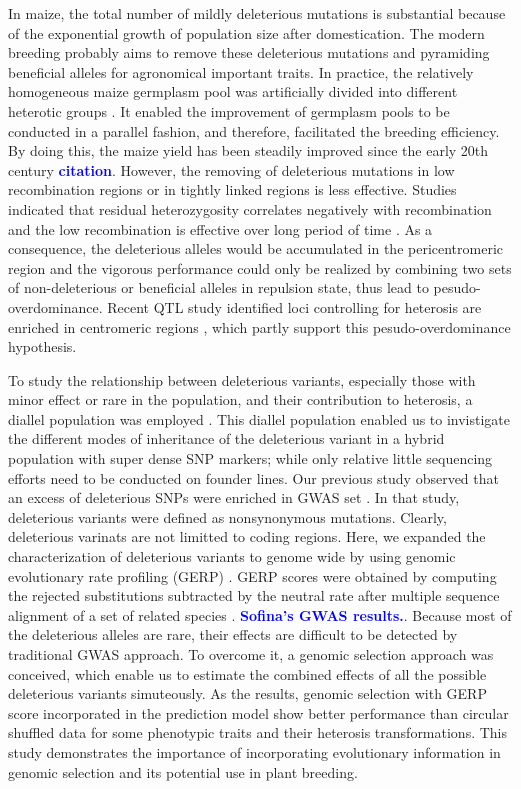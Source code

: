 \documentclass[9pt,twocolumn,twoside]{gsajnl}
\newcommand{\yang}[1]{\textcolor{blue}{\bf #1}}
\begin{document}
In maize, the total number of mildly deleterious mutations is substantial because of the exponential growth of population size after domestication. The modern breeding probably aims to remove these deleterious mutations and pyramiding beneficial alleles for agronomical important traits. In practice, the relatively homogeneous maize germplasm pool was artificially divided into different heterotic groups \citep{Heerwaarden2012}. It enabled the improvement of germplasm pools to be conducted in a parallel fashion, and therefore, facilitated the breeding efficiency. By doing this, the maize yield has been steadily improved since the early 20th century \yang{citation}. However, the removing of deleterious mutations in low recombination regions or in tightly linked regions is less effective. Studies indicated that residual heterozygosity correlates negatively with recombination \citep{Gore2009, McMullen2009} and the low recombination is effective over long period of time \citep{Haddrill2007}. As a consequence, the deleterious alleles would be accumulated in the pericentromeric region and the vigorous performance could only be realized by combining two sets of non-deleterious or beneficial alleles in repulsion state, thus lead to pesudo-overdominance. Recent QTL study identified loci controlling for heterosis are enriched in centromeric regions \citep{Lariepe2012}, which partly support this pesudo-overdominance hypothesis.

To study the relationship between deleterious variants, especially those with minor effect or rare in the population, and their contribution to heterosis, a diallel population was employed \citep{}. This diallel population enabled us to invistigate the different modes of inheritance of the deleterious variant in a hybrid population with super dense SNP markers; while only relative little sequencing efforts need to be conducted on founder lines. Our previous study observed that an excess of deleterious SNPs were enriched in GWAS set \citep{Mezmouk2014}. In that study, deleterious variants were defined as nonsynonymous mutations. Clearly, deleterious varinats are not limitted to coding regions. Here, we expanded the characterization of deleterious variants to genome wide by using genomic evolutionary rate profiling (GERP) \citep{Cooper2005}. GERP scores were obtained by computing the rejected substitutions subtracted by the neutral rate after multiple sequence alignment of a set of related species \citep{Davydov2010}. \yang{Sofina's GWAS results.}. Because most of the deleterious alleles are rare, their effects are difficult to be detected by traditional GWAS approach. To overcome it, a genomic selection approach was conceived, which enable us to estimate the combined effects of all the possible deleterious variants simuteously. As the results, genomic selection with GERP score incorporated in the prediction model show better performance than circular shuffled data for some phenotypic traits and their heterosis transformations. This study demonstrates the importance of incorporating evolutionary information in genomic selection and its potential use in plant breeding.
   
\end{document}
